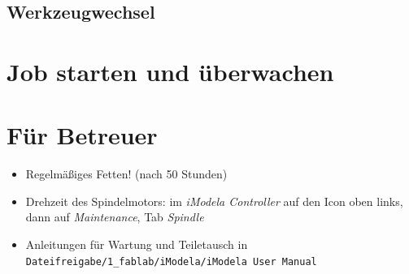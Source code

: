 \documentclass{\basedir/fablab-document}
\begin{document}
\subsection{Werkzeugwechsel}

\section{Job starten und überwachen}

\section{Für Betreuer}
\begin{itemize}
	\item Regelmäßiges Fetten! (nach 50 Stunden)
	\item Drehzeit des Spindelmotors: im \emph{iModela Controller} auf den Icon oben links, dann auf \emph{Maintenance}, Tab \emph{Spindle} 
	\item Anleitungen für Wartung und Teiletausch in \texttt{Dateifreigabe/1\_fablab/iModela/iModela User Manual}
\end{itemize}

\end{document}
